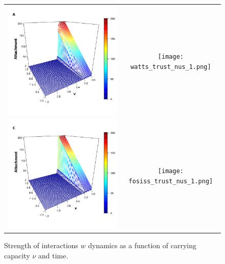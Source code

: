 \documentclass[11pt]{article}
\begin{document}
\FloatBarrier


\begin{figure} [h!]
\centering
\begin{tabular}{cc}

\includegraphics[scale=0.28]{images/erdos_trust_nus_1.png} & \texttt{[image: watts\_trust\_nus\_1.png]} \\
\includegraphics[scale=0.28]{images/barabasi_trust_nus_1.png} & \texttt{[image: fosiss\_trust\_nus\_1.png]}
\end{tabular}
\caption{Strength of interactions $w$ dynamics as a function of carrying capacity $\nu$ and time.}\label{trust}
\end{figure}
\end{document}
